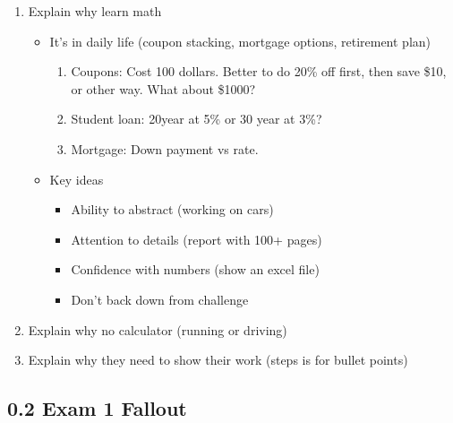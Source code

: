 \documentclass{article}
\begin{document}
\begin{enumerate}
\item Explain why learn math
\begin{itemize}
\item It's in daily life (coupon stacking, mortgage options, retirement plan)
\begin{enumerate}
\item Coupons: Cost 100 dollars. Better to do 20\% off first, then save \$10, or other way. What about \$1000?
\item Student loan: 20year at 5\% or 30 year at 3\%? 
\item Mortgage: Down payment vs rate. 
\end{enumerate}
\item Key ideas
\begin{itemize}
\item Ability to abstract (working on cars)
\item Attention to details (report with 100+ pages)
\item Confidence with numbers (show an excel file)
\item Don't back down from challenge
\end{itemize}
\end{itemize}
\item Explain why no calculator (running or driving)
\item Explain why they need to show their work (steps is for bullet points)
\end{enumerate}

\subsection{0.2 Exam 1 Fallout}
\end{document}
